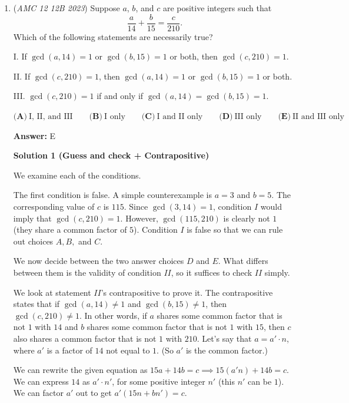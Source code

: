 \begin{enumerate}
 Putting all cases together, the total number of solutions is$\boxed{\textbf{(A) 5}}$.

 


	\item (\textit{AMC 12 12B 2023}) Suppose $a$, $b$, and $c$ are positive integers such that
 \[\frac{a}{14}+\frac{b}{15}=\frac{c}{210}.\]Which of the following statements are necessarily true?


 I. If $\gcd(a,14)=1$ or $\gcd(b,15)=1$ or both, then $\gcd(c,210)=1$.


 II. If $\gcd(c,210)=1$, then $\gcd(a,14)=1$ or $\gcd(b,15)=1$ or both.


 III. $\gcd(c,210)=1$ if and only if $\gcd(a,14)=\gcd(b,15)=1$.


 $\textbf{(A)}~\text{I, II, and III}\qquad\textbf{(B)}~\text{I only}\qquad\textbf{(C)}~\text{I and II only}\qquad\textbf{(D)}~\text{III only}\qquad\textbf{(E)}~\text{II and III only}$

 \textbf{Answer: }E



\textbf{Solution 1 (Guess and check + Contrapositive)}

We examine each of the conditions. 

 The first condition is false. A simple counterexample is $a=3$ and $b=5$. The corresponding value of $c$ is $115$. Since $\gcd(3,14)=1$, condition $I$ would imply that $\gcd(c,210)=1.$ However, $\gcd(115,210)$ is clearly not $1$ (they share a common factor of $5$). Condition $I$ is false so that we can rule out choices $A,B,$ and $C$. 

 We now decide between the two answer choices $D$ and $E$. What differs between them is the validity of condition $II$, so it suffices to check $II$ simply. 

 We look at statement $II$'s contrapositive to prove it. The contrapositive states that if $\gcd(a,14)\neq1$ and $\gcd(b,15)\neq1$, then $\gcd(c,210)\neq1.$ In other words, if $a$ shares some common factor that is not $1$ with $14$ and $b$ shares some common factor that is not $1$ with $15$, then $c$ also shares a common factor that is not $1$ with $210$. Let's say that $a=a'\cdot n$, where $a'$ is a factor of $14$ not equal to $1$. (So $a'$ is the common factor.) 

 We can rewrite the given equation as $15a+14b=c\implies15(a'n)+14b=c.$ We can express $14$ as $a'\cdot n'$, for some positive integer $n'$ (this $n'$ can be $1$). We can factor $a'$ out to get $a'(15n+bn')=c.$ 


\end{enumerate}
